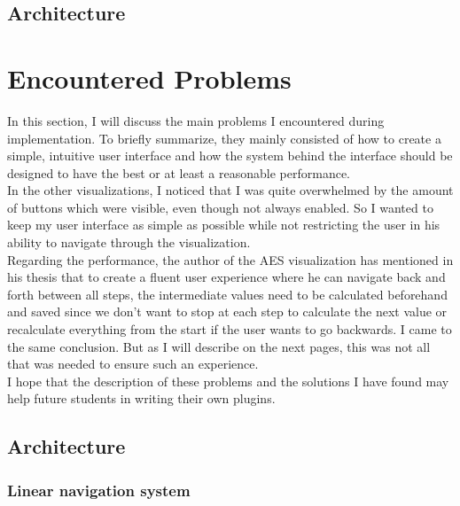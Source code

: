 \subsection{Architecture}
\label{sec:Architecture}


\section{Encountered Problems}
\label{sec:encounteredProblems}

In this section, I will discuss the main problems I encountered during implementation. To briefly summarize, they mainly consisted of how to create a simple, intuitive user interface and how the system behind the interface should be designed to have the best or at least a reasonable performance. \\ In the other visualizations, I noticed that I was quite overwhelmed by the amount of buttons which were visible, even though not always enabled. So I wanted to keep my user interface as simple as possible while not restricting the user in his ability to navigate through the visualization. \\ Regarding the performance, the author of the AES visualization has mentioned in his thesis that to create a fluent user experience where he can navigate back and forth between all steps, the intermediate values need to be calculated beforehand and saved since we don't want to stop at each step to calculate the next value or recalculate everything from the start if the user wants to go backwards. I came to the same conclusion. But as I will describe on the next pages, this was not all that was needed to ensure such an experience.\\
I hope that the description of these problems and the solutions I have found may help future students in writing their own plugins.

\subsection{Architecture}

\subsubsection{Linear navigation system}

